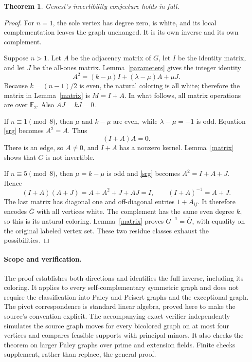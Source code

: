 \documentclass[11pt]{article}
\newtheorem{theorem}{Theorem}
\newcommand{\F}{\mathbb F_2}
\begin{document}
\begin{theorem}
Genest's invertibility conjecture holds in full.
\end{theorem}
\begin{proof}
For \(n=1\), the sole vertex has degree zero, is white, and its local
complementation leaves the graph unchanged. It is its own inverse and
its own complement.

Suppose \(n>1\). Let \(A\) be the adjacency matrix of \(G\), let \(I\)
be the identity matrix, and let \(J\) be the all-ones matrix.
Lemma~\ref{parameters} gives the integer identity
\begin{equation}\label{srg}
 A^2=(k-\mu)I+(\lambda-\mu)A+\mu J.
\end{equation}
Because \(k=(n-1)/2\) is even, the natural coloring is all white;
therefore the matrix in Lemma~\ref{matrix} is \(M=I+A\).
In what follows, all matrix operations are over \(\F\).
Also \(AJ=kJ=0\).

If \(n\equiv1\pmod8\), then \(\mu\) and \(k-\mu\) are even, while
\(\lambda-\mu=-1\) is odd. Equation \eqref{srg} becomes \(A^2=A\).
Thus
\[
 (I+A)A=0.
\]
There is an edge, so \(A\ne0\), and \(I+A\) has a nonzero kernel.
Lemma~\ref{matrix} shows that \(G\) is not invertible.

If \(n\equiv5\pmod8\), then \(\mu=k-\mu\) is odd and
\eqref{srg} becomes \(A^2=I+A+J\). Hence
\[
 (I+A)(A+J)=A+A^2+J+AJ=I,
 \qquad (I+A)^{-1}=A+J.
\]
The last matrix has diagonal one and off-diagonal entries
\(1+A_{ij}\). It therefore encodes \(\overline G\) with all vertices
white. The complement has the same even degree \(k\), so this is its
natural coloring. Lemma~\ref{matrix} proves
\(G^{-1}=\overline G\), with equality on the original labeled vertex set.
These two residue classes exhaust the possibilities.
\end{proof}

\paragraph{Scope and verification.}
The proof establishes both directions and identifies the full inverse,
including its coloring. It applies to every self-complementary symmetric
graph and does not require the classification into Paley and Peisert
graphs and the exceptional graph. The pivot correspondence is standard
linear algebra, proved here to make the source's convention explicit.
The accompanying exact verifier independently simulates the source
graph moves for every bicolored graph on at most four vertices and
compares feasible supports with principal minors. It also checks the
theorem on larger Paley graphs over prime and extension fields.
Finite checks supplement, rather than replace, the general proof.
\end{document}
